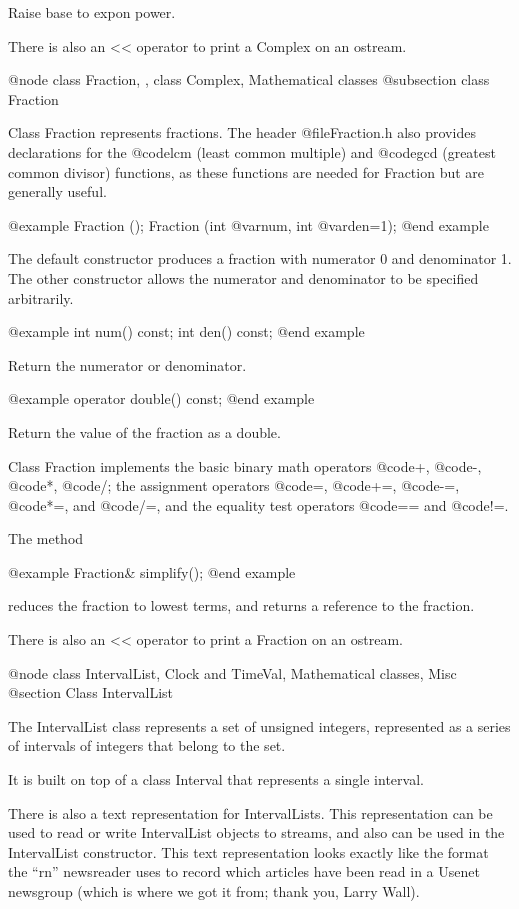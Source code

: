 Raise base to expon power.

There is also an << operator to print a Complex on an ostream.

@node class Fraction,  , class Complex, Mathematical classes
@subsection class Fraction

Class Fraction represents fractions.  The header @file{Fraction.h}
also provides declarations for the @code{lcm} (least common multiple)
and @code{gcd} (greatest common divisor) functions, as these functions
are needed for Fraction but are generally useful.

@example
Fraction ();
Fraction (int @var{num}, int @var{den}=1);
@end example

The default constructor produces a fraction with numerator 0 and
denominator 1.  The other constructor allows the numerator and
denominator to be specified arbitrarily.

@example
int num() const;
int den() const;
@end example

Return the numerator or denominator.

@example
operator double() const;
@end example

Return the value of the fraction as a double.

Class Fraction implements the basic binary math operators
@code{+}, @code{-}, @code{*}, @code{/}; the assignment
operators @code{=}, @code{+=}, @code{-=}, @code{*=},
and @code{/=}, and the equality test operators @code{==}
and @code{!=}.

The method

@example
Fraction& simplify();
@end example

reduces the fraction to lowest terms, and returns a reference
to the fraction.

There is also an << operator to print a Fraction on an ostream.

@node class IntervalList, Clock and TimeVal, Mathematical classes, Misc
@section Class IntervalList

The IntervalList class represents a set of unsigned integers, represented
as a series of intervals of integers that belong to the set.

It is built on top of a class Interval that represents a single
interval.

There is also a text representation for IntervalLists.  This
representation can be used to read or write IntervalList objects
to streams, and also can be used in the IntervalList constructor.
This text representation looks exactly like the format the ``rn''
newsreader uses to record which articles have been read in a
Usenet newsgroup (which is where we got it from; thank you, Larry
Wall).


